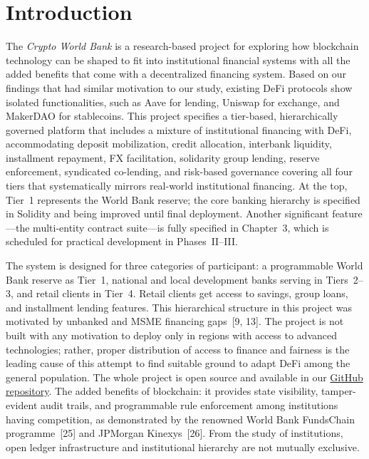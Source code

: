 \documentclass[12pt,a4paper]{report}
\begin{document}
\newpage
{}
\setcounter{page}{1}


\chapter{Introduction}
\label{sec:intro}

The \textit{Crypto World Bank} is a research-based project for exploring how blockchain technology can be shaped to fit into institutional financial systems with all the added benefits that come with a decentralized financing system. Based on our findings that had similar motivation to our study, existing DeFi protocols show isolated functionalities, such as Aave for lending, Uniswap for exchange, and MakerDAO for stablecoins. This project specifies a tier-based, hierarchically governed platform that includes a mixture of institutional financing with DeFi, accommodating deposit mobilization, credit allocation, interbank liquidity, installment repayment, FX facilitation, solidarity group lending, reserve enforcement, syndicated co-lending, and risk-based governance covering all four tiers that systematically mirrors real-world institutional financing. At the top, Tier~1 represents the World Bank reserve; the core banking hierarchy is specified in Solidity and being improved until final deployment. Another significant feature---the multi-entity contract suite---is fully specified in Chapter~3, which is scheduled for practical development in Phases~II--III.

The system is designed for three categories of participant: a programmable World Bank reserve as Tier~1, national and local development banks serving in Tiers~2--3, and retail clients in Tier~4. Retail clients get access to savings, group loans, and installment lending features. This hierarchical structure in this project was motivated by unbanked and MSME financing gaps~[9, 13]. The project is not built with any motivation to deploy only in regions with access to advanced technologies; rather, proper distribution of access to finance and fairness is the leading cause of this attempt to find suitable ground to adapt DeFi among the general population. The whole project is open source and available in our \href{https://github.com/Yuvraajrahman/Cryto-World-Bank}{GitHub repository}. The added benefits of blockchain: it provides state visibility, tamper-evident audit trails, and programmable rule enforcement among institutions having competition, as demonstrated by the renowned World Bank FundsChain programme~[25] and JPMorgan Kinexys~[26]. From the study of institutions, open ledger infrastructure and institutional hierarchy are not mutually exclusive.
\end{document}
